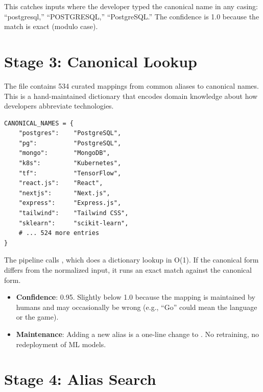 This catches inputs where the developer typed the canonical name in any
casing: ``postgresql,'' ``POSTGRESQL,'' ``PostgreSQL.''  The confidence
is 1.0 because the match is exact (modulo case).


\section{Stage 3: Canonical Lookup}
\label{sec:er-canonical}

The  file contains 534 curated mappings from
common aliases to canonical names.  This is a hand-maintained dictionary
that encodes domain knowledge about how developers abbreviate technologies.

\begin{lstlisting}[style=python, caption={Excerpt from \ic{CANONICAL\_NAMES} (10 of 534 entries).}]
CANONICAL_NAMES = {
    "postgres":    "PostgreSQL",
    "pg":          "PostgreSQL",
    "mongo":       "MongoDB",
    "k8s":         "Kubernetes",
    "tf":          "TensorFlow",
    "react.js":    "React",
    "nextjs":      "Next.js",
    "express":     "Express.js",
    "tailwind":    "Tailwind CSS",
    "sklearn":     "scikit-learn",
    # ... 524 more entries
}
\end{lstlisting}

The pipeline calls , which does a
dictionary lookup in O(1).  If the canonical form differs from the
normalized input, it runs an exact match against the canonical form.

\begin{itemize}
    \item \textbf{Confidence}: 0.95.  Slightly below 1.0 because the
          mapping is maintained by humans and may occasionally be wrong
          (e.g., ``Go'' could mean the language or the game).
    \item \textbf{Maintenance}: Adding a new alias is a one-line change
          to .  No retraining, no redeployment of
          ML models.
\end{itemize}


\section{Stage 4: Alias Search}
\label{sec:er-alias}

